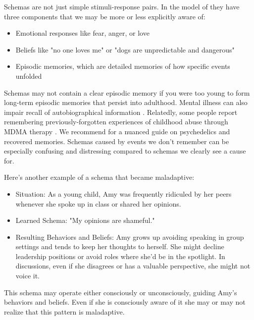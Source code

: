 \documentclass[12pt,letterpaper]{book}
\begin{document}
Schemas are not just simple stimuli-response pairs. In the model of \textcite{laneReconsolidation} they have three components that we may be more or less explicitly aware of:
\begin{itemize}
	\item Emotional responses like fear, anger, or love
	\item Beliefs like "no one loves me" or "dogs are unpredictable and dangerous"
	\item Episodic memories, which are detailed memories of how specific events unfolded
\end{itemize}
Schemas may not contain a clear episodic memory if you were too young to form long-term episodic memories that persist into adulthood. Mental illness can also impair recall of autobiographical information \cite{berghSelfEvidencing}. Relatedly, some people report remembering previously-forgotten experiences of childhood abuse through MDMA therapy \cite{psychedelicrecoveredmemory}. We recommend \textcite{psychedelicrecoveredmemory} for a nuanced guide on psychedelics and recovered memories. Schemas caused by events we don't remember can be especially confusing and distressing compared to schemas we clearly see a cause for.

Here's another example of a schema that became maladaptive:
\begin{itemize}
    \item Situation: As a young child, Amy was frequently ridiculed by her peers whenever she spoke up in class or shared her opinions.
    \item Learned Schema: "My opinions are shameful."
    \item Resulting Behaviors and Beliefs: Amy grows up avoiding speaking in group settings and tends to keep her thoughts to herself. She might decline leadership positions or avoid roles where she'd be in the spotlight. In discussions, even if she disagrees or has a valuable perspective, she might not voice it.
\end{itemize}
This schema may operate either consciously or unconsciously, guiding Amy's behaviors and beliefs. Even if she is consciously aware of it she may or may not realize that this pattern is maladaptive.
\end{document}
